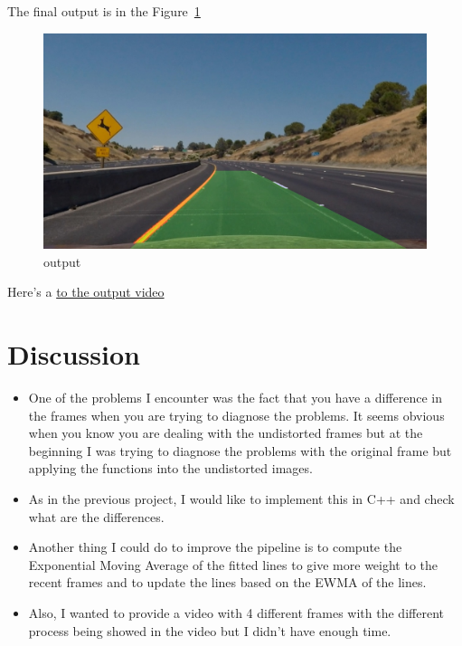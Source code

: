 \documentclass[11pt, a4paper]{article}
\begin{document}
The final output is in the Figure~\ref{fig:output}

\begin{figure}[htb!]
	\centering
	\includegraphics[width=0.8\linewidth]{output}
	\caption{output}
	\label{fig:output}
\end{figure}


Here's a \href{https://github.com/SamuelNavarro/SelfDriving/tree/master/AdvancedLaneFinding/Project/test_videos_output}{to the output video}






\section{Discussion}
\label{sec:discussion}



\begin{itemize}
	\item One of the problems I encounter was the fact that you have a difference in the frames when you are trying to diagnose the problems. It seems obvious when you know you are dealing with the undistorted frames but at the beginning I was trying to diagnose the problems with the original frame but applying the functions into the undistorted images.
	\item As in the previous project, I would like to implement this in C++ and check what are the differences.
	\item Another thing I could do to improve the pipeline is to compute the Exponential Moving Average of the fitted lines to give more weight to the recent frames and to update the lines based on the EWMA of the lines.
	\item Also, I wanted to provide a video with 4 different frames with the different process being showed in the video but I didn't have enough time.
\end{itemize}
\end{document}
